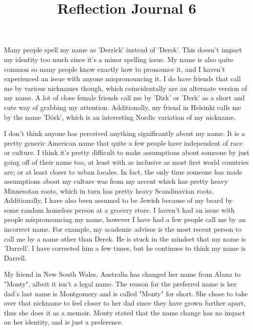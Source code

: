 \documentclass[12pt]{article}
\begin{document}
\title{Reflection Journal 6}

\par
Many people spell my name as 'Derrick' instead of 'Derek'. This doesn't impact my identity too much since it's a minor spelling issue. My name is also quite common so many people know exactly how to pronounce it, and I haven't experienced an issue with anyone mispronouncing it. I do have friends that call me by various nicknames though, which coincidentally are an alternate version of my name. A lot of close female friends call me by 'Dirk' or 'Derk' as a short and cute way of grabbing my attention. Additionally, my friend in Helsinki calls me by the name 'D\"ork', which is an interesting Nordic variation of my nickname.
\par
I don't think anyone has perceived anything significantly about my name. It is a pretty generic American name that quite a few people have independent of race or culture. I think it's pretty difficult to make assumptions about someone by just going off of their name too, at least with as inclusive as most first world countries are; or at least closer to urban locales. In fact, the only time someone has made assumptions about my culture was from my accent which has pretty heavy Minnesotan roots, which in turn has pretty heavy Scandinavian roots. Additionally, I have also been assumed to be Jewish because of my beard by some random homeless person at a grocery store. 
I haven't had an issue with people mispronouncing my name, however I have had a few people call me by an incorrect name. For example, my academic advisor is the most recent person to call me by a name other than Derek. He is stuck in the mindset that my name is 'Darrell'. I have corrected him a few times, but he continues to think my name is Darrell.
\par

My friend in New South Wales, Australia has changed her name from Alana to "Monty", albeit it isn't a legal name. The reason for the preferred name is her dad's last name is Montgomery and is called "Monty" for short. She chose to take over that nickname to feel closer to her dad since they have grown further apart, thus she does it as a memoir. Monty stated that the name change has no impact on her identity, and is just a preference.
\par
\end{document}
